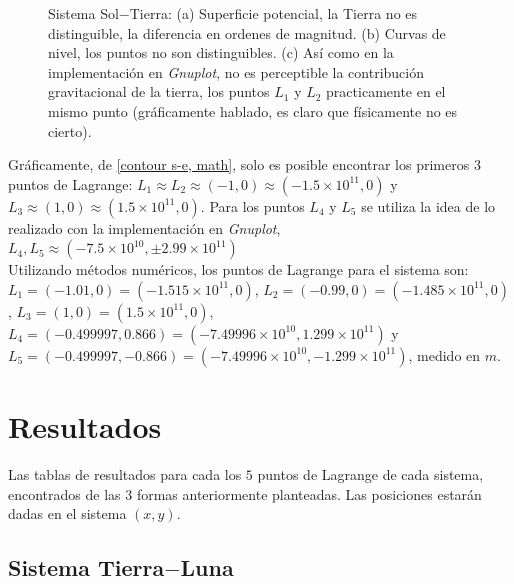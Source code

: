 \begin{figure}[H]
\caption{Sistema Sol$-$Tierra: (a) Superficie potencial, la Tierra no es distinguible, la diferencia en ordenes de magnitud. (b) Curvas de nivel, los puntos no son distinguibles. (c) Así como en la implementación en \textit{Gnuplot}, no es perceptible la contribución gravitacional de la tierra, los puntos $L_1$ y $L_2$ practicamente en el mismo punto (gráficamente hablado, es claro que físicamente no es cierto).}
\label{superficie, cn s-e, math}
\end{figure}

Gráficamente, de \ref{contour s-e, math}, solo es posible encontrar los primeros $3$ puntos de Lagrange: $L_1 \approx L_2 \approx (-1,0) \approx (-1.5\times 10^{11},0)$ y $L_3 \approx (1,0) \approx (1.5\times 10^{11},0)$. Para los puntos $L_4$ y $L_5$ se utiliza la idea de lo realizado con la implementación en \textit{Gnuplot}, $L_4,L_5 \approx (-7.5\times 10^{10},\pm 2.99\times 10^{11})$ \\

Utilizando métodos numéricos, los puntos de Lagrange para el sistema son: $L_1 = (-1.01, 0) = (-1.515\times 10^{11} ,0)$, $L_2 = (-0.99, 0) = (-1.485\times 10^{11} ,0)$, $L_3 = (1,0) = (1.5\times 10^{11} ,0)$, $L_4 = (-0.499997, 0.866) = (-7.49996\times 10^{10} ,1.299\times 10^{11})$ y $L_5 = (-0.499997,-0.866) = (-7.49996\times 10^{10} ,-1.299\times 10^{11})$, medido en $m$.





\section{Resultados}
\label{sec:resultados}

Las tablas de resultados para cada los $5$ puntos de Lagrange de cada sistema, encontrados de las $3$ formas anteriormente planteadas. Las posiciones estarán dadas en el sistema $(x,y)$.

\subsection{Sistema Tierra$-$Luna}

